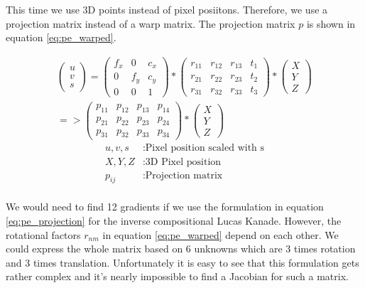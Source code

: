 \documentclass[11pt,a4paper,titlepage,oneside]{report}
\begin{document}
This time we use 3D points instead of pixel posiitons. Therefore, we use a projection matrix instead of a warp matrix. The projection matrix $p$ is shown in equation \ref{eq:pe_warped}. 

\begin{equation}\label{eq:pe_warped}
	\begin{split}
	\begin{pmatrix}
		u \\
		v \\
		s
	\end{pmatrix}=
	\begin{pmatrix}
		f_x & 0 & c_x \\
		0 & f_y & c_y \\
		0 & 0 & 1
	\end{pmatrix}*
	\begin{pmatrix}
		r_{11} & r_{12} & r_{13} & t_{1} \\
		r_{21} & r_{22} & r_{23} & t_{2} \\
		r_{31} & r_{32} & r_{33} & t_{3}
	\end{pmatrix}*
	\begin{pmatrix}
		X\\
		Y\\
		Z
	\end{pmatrix}\\
	=>\begin{pmatrix}
		p_{11} & p_{12} & p_{13} & p_{14} \\
		p_{21} & p_{22} & p_{23} & p_{24} \\
		p_{31} & p_{32} & p_{33} & p_{34}
	\end{pmatrix}*
	\begin{pmatrix}
		X\\
		Y\\
		Z
	\end{pmatrix}
\end{split}
\end{equation}
\begin{align*}
	u,v,s			&:	\text{Pixel position scaled with s}\\
	X,Y,Z			&:	\text{3D Pixel position}\\
	p_{ij}		&:	\text{Projection matrix}\\
\end{align*}

We would need to find 12 gradients if we use the formulation in equation \ref{eq:pe_projection} for the inverse compositional Lucas Kanade. However, the rotational factors $r_{nm}$ in equation \ref{eq:pe_warped} depend on each other. We could express the whole matrix based on 6 unknowns which are 3 times rotation and 3 times translation. Unfortunately it is easy to see that this formulation gets rather complex and it's nearly impossible to find a Jacobian for such a matrix.\\
\end{document}
